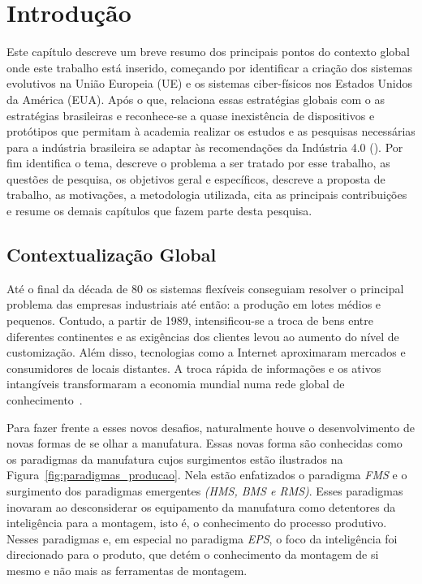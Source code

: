 \chapter{Introdução}
\label{cap:introdução}


Este capítulo descreve um breve resumo dos principais pontos do contexto global onde este trabalho está inserido, começando por identificar a criação dos sistemas evolutivos na União Europeia (UE) e os sistemas ciber-físicos nos Estados Unidos da América (EUA). Após o que, relaciona essas estratégias globais com o as estratégias brasileiras e reconhece-se a quase inexistência de dispositivos e protótipos que permitam à academia realizar os estudos e as pesquisas necessárias para a indústria brasileira se adaptar às recomendações da Indústria 4.0 (\iQuatroZero). Por fim identifica o tema, descreve o problema a ser tratado por esse trabalho, as questões de pesquisa, os objetivos geral e específicos, descreve a proposta de trabalho, as motivações, a metodologia utilizada, cita as principais contribuições e resume os demais capítulos que fazem parte desta pesquisa. 



\section{Contextualização Global}
 
Até o final da década de 80 os sistemas flexíveis conseguiam resolver o principal problema das empresas industriais até então: a produção em lotes médios e pequenos. Contudo, a partir de 1989, intensificou-se a troca de bens entre diferentes continentes e as exigências dos clientes levou ao aumento do nível de customização. Além disso, tecnologias como a Internet aproximaram mercados e consumidores de locais distantes. A troca rápida de informações e os ativos intangíveis transformaram a economia mundial numa rede global de conhecimento~\cite{Abele}.

Para fazer frente a esses novos desafios, naturalmente houve o desenvolvimento de novas formas de se olhar a manufatura. Essas novas forma são conhecidas como os paradigmas da manufatura cujos surgimentos estão ilustrados  na Figura~\ref{fig:paradigmas_producao}. Nela estão enfatizados o paradigma \textit{FMS} e o surgimento dos paradigmas emergentes \textit{(HMS, BMS e RMS)}. Esses paradigmas inovaram ao desconsiderar os equipamento da manufatura como detentores da inteligência para a montagem, isto é, o conhecimento do processo produtivo. Nesses paradigmas e, em especial no paradigma \textit{EPS}, o foco da inteligência foi direcionado para o produto, que detém o conhecimento da montagem de si mesmo e não mais as ferramentas de montagem. 


